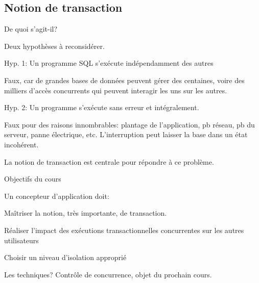 

\subsection{Notion de transaction}

\begin{frame}{De quoi s'agit-il?}

Deux hypothèses à reconsidérer.

\begin{redbullet}
  \item Hyp. 1: \alert{Un programme SQL s'exécute indépendamment des autres}

 \alert{Faux}, car de grandes bases de données peuvent gérer des centaines,
          voire des milliers d'accès \alert{concurrents} qui peuvent interagir
          les uns sur les autres.
  
  \item Hyp. 2: \alert{Un programme s'exécute sans erreur et intégralement.}

\alert{Faux} pour des raisons innombrables: plantage de l'application, 
                pb réseau, pb du serveur, panne électrique, etc. 
                L'interruption peut laisser la base dans un état \alert{incohérent}.

\end{redbullet}

\begin{blocgauche}
La 
notion de \alert{transaction} est centrale pour répondre  à ce problème.
\end{blocgauche}

\end{frame}


\begin{frame}{Objectifs du cours}

Un concepteur d'application doit:

\vfill

\begin{redbullet}
  \item Maîtriser la notion, très importante, de \alert{transaction}.
   

   \item Réaliser l'impact des \alert{exécutions} transactionnelles
       \alert{concurrentes}  sur les autres utilisateurs

      
  \item  Choisir un \alert{niveau d'isolation} approprié	

\end{redbullet}

\vfill

\begin{blocgauche}
Les techniques? \alert{Contrôle de concurrence}, objet du prochain cours.
\end{blocgauche}
\end{frame}

